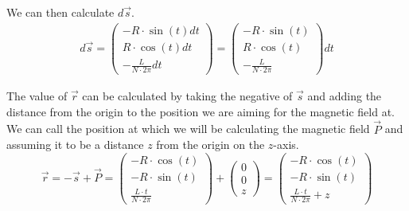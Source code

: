 \documentclass[12pt]{article}
\begin{document}
    We can then calculate $d\vec{s}$.
    \begin{gather}
        d\vec{s}    =   \begin{pmatrix}
                -R \cdot \sin(t) dt\\
                R \cdot \cos(t) dt\\
                -\frac{L}{N \cdot 2\pi} dt
            \end{pmatrix}
            =   \begin{pmatrix}
                -R \cdot \sin(t)\\
                R \cdot \cos(t)\\
                -\frac{L}{N \cdot 2\pi}
            \end{pmatrix} dt
    \end{gather}

    The value of $\vec{r}$ can be calculated by taking the negative of $\vec{s}$ and adding the distance from the origin to the position we are aiming for the magnetic field at.
    We can call the position at which we will be calculating the magnetic field $\vec{P}$ and assuming it to be a distance $z$ from the origin on the $z$-axis.
    \begin{equation}
        \vec{r} =   -\vec{s} + \vec{P} 
            =   \begin{pmatrix}
                -R \cdot \cos(t)\\
                -R \cdot \sin(t)\\
                \frac{L \cdot t}{N \cdot 2\pi}
            \end{pmatrix} + 
            \begin{pmatrix} 0\\ 0\\ z \end{pmatrix}
            =   \begin{pmatrix}
                -R \cdot \cos(t)\\
                -R \cdot \sin(t)\\
                \frac{L \cdot t}{N \cdot 2\pi} + z
            \end{pmatrix}
    \end{equation}
\end{document}

